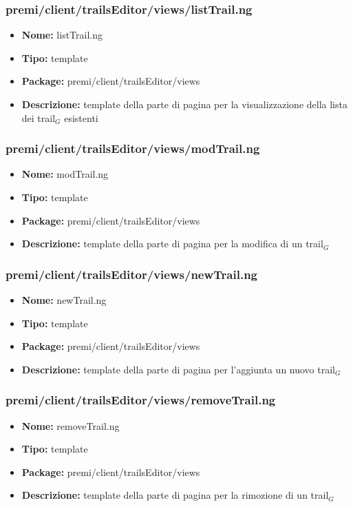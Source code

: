 \subsubsection{premi/client/trailsEditor/views/listTrail.ng}
\begin{itemize}
  \item[] \textbf{Nome:} listTrail.ng
  \item[] \textbf{Tipo:} template
  \item[] \textbf{Package:} premi/client/trailsEditor/views
  \item[] \textbf{Descrizione:}  template della parte di pagina per la visualizzazione della lista dei trail$_G$ esistenti
\end{itemize}
\subsubsection{premi/client/trailsEditor/views/modTrail.ng}
\begin{itemize}
  \item[] \textbf{Nome:} modTrail.ng
  \item[] \textbf{Tipo:} template
  \item[] \textbf{Package:} premi/client/trailsEditor/views
  \item[] \textbf{Descrizione:}  template della parte di pagina per la modifica di un trail$_G$
\end{itemize}
\subsubsection{premi/client/trailsEditor/views/newTrail.ng}
\begin{itemize}
  \item[] \textbf{Nome:} newTrail.ng
  \item[] \textbf{Tipo:} template
  \item[] \textbf{Package:} premi/client/trailsEditor/views
  \item[] \textbf{Descrizione:}  template della parte di pagina per l'aggiunta un nuovo trail$_G$
\end{itemize}
\subsubsection{premi/client/trailsEditor/views/removeTrail.ng}
\begin{itemize}
  \item[] \textbf{Nome:} removeTrail.ng
  \item[] \textbf{Tipo:} template
  \item[] \textbf{Package:} premi/client/trailsEditor/views
  \item[] \textbf{Descrizione:}  template della parte di pagina per la rimozione di un trail$_G$
\end{itemize}
